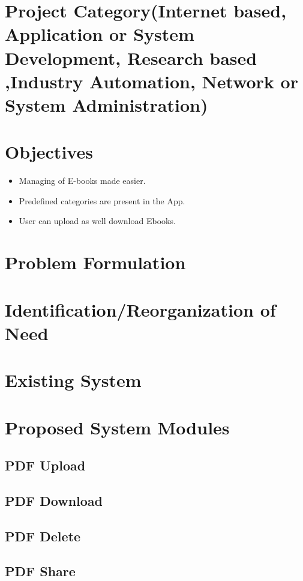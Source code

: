 \section{Project Category(Internet based, Application or System Development, Research based ,Industry Automation, Network or System Administration)}

\section{Objectives}

\begin{itemize}
	\item Managing of E-books made easier.

	\item Predefined categories are present in the App.
	
	\item User can upload as well download Ebooks.


\end{itemize}

\section{Problem Formulation}

\section{Identification/Reorganization of Need}

\section{Existing System}

\section{Proposed System Modules}
\subsection{PDF Upload}
\subsection{PDF Download}
\subsection{PDF Delete}
\subsection{PDF Share}

